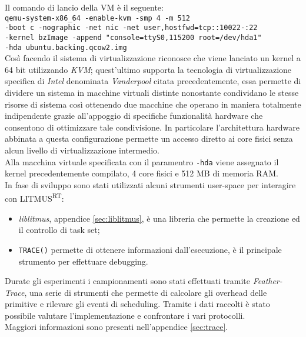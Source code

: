 \noindent Il comando di lancio della VM è il seguente:\\

\noindent \texttt{qemu-system-x86\_64 -enable-kvm -smp 4 -m 512 \\
-boot c -nographic -net nic -net user,hostfwd=tcp::10022-:22 \\
-kernel bzImage -append "console=ttyS0,115200 root=/dev/hda1" \\ 
-hda ubuntu.backing.qcow2.img}\\

\noindent Così facendo il sistema di virtualizzazione riconosce che viene lanciato un kernel a 64 bit utilizzando \textit{KVM}; quest'ultimo supporta la tecnologia di virtualizzazione specifica di \textit{Intel} denominata \textit{Vanderpool} citata precedentemente, essa permette di dividere un sistema in macchine virtuali distinte nonostante condividano le stesse risorse di sistema così ottenendo due macchine che operano in maniera totalmente indipendente grazie all'appoggio di specifiche funzionalità hardware che consentono di ottimizzare tale condivisione. In particolare l'architettura hardware abbinata a questa configurazione permette un accesso diretto ai core fisici senza alcun livello di virtualizzazione intermedio.\\
\noindent Alla macchina virtuale specificata con il paramentro \texttt{-hda} viene assegnato il kernel precedentemente compilato, 4 core fisici e 512 MB di memoria RAM.\\

\noindent In fase di sviluppo sono stati utilizzati alcuni strumenti user-space per interagire con LITMUS\textsuperscript{RT}:\\

\begin{itemize}
  \item \textit{liblitmus}, appendice \ref{sec:liblitmus}, è una libreria che permette la creazione ed il controllo di task set;
  \item \texttt{TRACE()} permette di ottenere informazioni dall'esecuzione, è il principale strumento per effettuare debugging.\\
\end{itemize}

\noindent Durate gli esperimenti i campionamenti sono stati effettuati tramite \textit{Feather-Trace}, una serie di strumenti che permette di calcolare gli overhead delle primitive e rilevare gli eventi di scheduling. Tramite i dati raccolti è stato possibile valutare l'implementazione e confrontare i vari protocolli.\\
Maggiori informazioni sono presenti nell'appendice \ref{sec:trace}.\\

